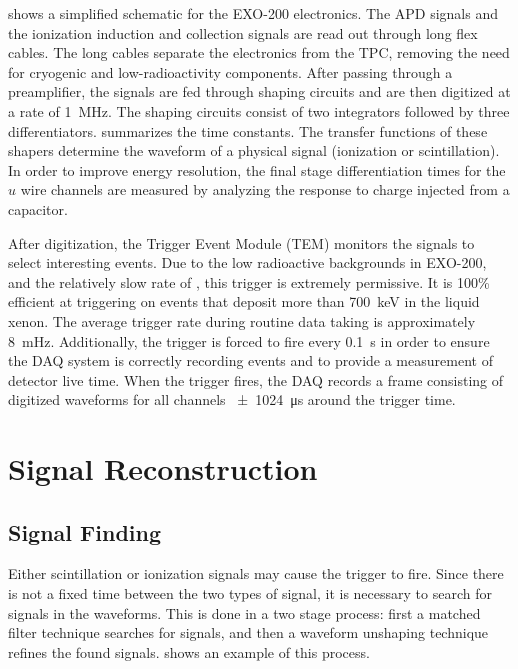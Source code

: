 \documentclass[herrin-thesis.tex]{subfiles}
\begin{document}
 shows a simplified schematic for the EXO-200 electronics. The APD signals and the ionization induction and collection signals are read out through long flex cables. The long cables separate the electronics from the TPC, removing the need for cryogenic and low-radioactivity components. After passing through a preamplifier, the signals are fed through shaping circuits and are then digitized at a rate of \SI{1}{\MHz}. The shaping circuits consist of two integrators followed by three differentiators.  summarizes the time constants.  The transfer functions of these shapers determine the waveform of a physical signal (ionization or scintillation). In order to improve energy resolution, the final stage differentiation times for the \(u\) wire channels are measured by analyzing the response to charge injected from a capacitor.

After digitization, the Trigger Event Module (TEM) monitors the signals to select interesting events. Due to the low radioactive backgrounds in EXO-200, and the relatively slow rate of \twonu, this trigger is extremely permissive. It is 100\% efficient at triggering on events that deposit more than \SI{700}{\keV} in the liquid xenon. The average trigger rate during routine data taking is approximately \SI{8}{\mHz}. Additionally, the trigger is forced to fire every \SI{0.1}{\s} in order to ensure the DAQ system is correctly recording events and to provide a measurement of detector live time. When the trigger fires, the DAQ records a frame consisting of digitized waveforms for all channels \SI{\pm1024}{\micro\s} around the trigger time.

\section{Signal Reconstruction}
\label{sec:data_reconstruction}
\subsection{Signal Finding}
Either scintillation or ionization signals may cause the trigger to fire. Since there is not a fixed time between the two types of signal, it is necessary to search for signals in the waveforms. This is done in a two stage process: first a matched filter technique searches for signals, and then a waveform unshaping technique refines the found signals.  shows an example of this process.
\end{document}
